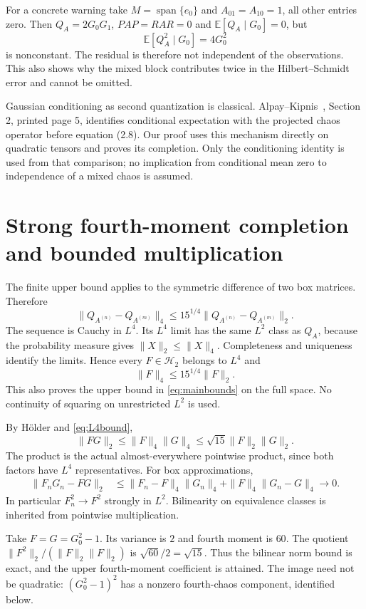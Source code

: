 \documentclass[11pt]{article}
\newcommand{\E}{\mathbb E}
\newcommand{\Hh}{\mathcal H}
\begin{document}
For a concrete warning take $M=\operatorname{span}\{e_0\}$ and
$A_{01}=A_{10}=1$, all other entries zero. Then $Q_A=2G_0G_1$,
$PAP=RAR=0$ and $\E[Q_A\mid G_0]=0$, but
\[
 \E[Q_A^2\mid G_0]=4G_0^2
\]
is nonconstant. The residual is therefore not independent of the
observations. This also shows why the mixed block contributes twice
in the Hilbert--Schmidt error and cannot be omitted.

Gaussian conditioning as second quantization is classical.
Alpay--Kipnis~\cite{AlpayKipnis}, Section 2, printed page 5,
identifies conditional expectation with the projected chaos operator
before equation (2.8). Our proof uses this mechanism directly on
quadratic tensors and proves its completion. Only the conditioning
identity is used from that comparison; no implication from conditional
mean zero to independence of a mixed chaos is assumed.

\section{Strong fourth-moment completion and bounded multiplication}
The finite upper bound applies to the symmetric difference of two
box matrices. Therefore
\[
 \|Q_{A^{(n)}}-Q_{A^{(m)}}\|_4
 \leq15^{1/4}\|Q_{A^{(n)}}-Q_{A^{(m)}}\|_2.
\]
The sequence is Cauchy in $L^4$. Its $L^4$ limit has the same
$L^2$ class as $Q_A$, because the probability measure gives
$\|X\|_2\leq\|X\|_4$. Completeness and uniqueness identify the
limits. Hence every $F\in\Hh_2$ belongs to $L^4$ and
\begin{equation}\label{eq:L4bound}
 \|F\|_4\leq15^{1/4}\|F\|_2.
\end{equation}
This also proves the upper bound in \eqref{eq:mainbounds} on the
full space. No continuity of squaring on unrestricted $L^2$ is used.

By H\"older and \eqref{eq:L4bound},
\[
 \|FG\|_2\leq\|F\|_4\|G\|_4
 \leq\sqrt{15}\|F\|_2\|G\|_2.
\]
The product is the actual almost-everywhere pointwise product, since
both factors have $L^4$ representatives. For box approximations,
\begin{align*}
 \|F_nG_n-FG\|_2
 &\leq\|F_n-F\|_4\|G_n\|_4
       +\|F\|_4\|G_n-G\|_4\longrightarrow0.
\end{align*}
In particular $F_n^2\to F^2$ strongly in $L^2$. Bilinearity on
equivalence classes is inherited from pointwise multiplication.

Take $F=G=G_0^2-1$. Its variance is $2$ and fourth moment is
$60$. The quotient $\|F^2\|_2/(\|F\|_2\|F\|_2)$ is
$\sqrt{60}/2=\sqrt{15}$. Thus the bilinear norm bound is exact,
and the upper fourth-moment coefficient is attained. The image
need not be quadratic: $(G_0^2-1)^2$ has a nonzero fourth-chaos
component, identified below.
\end{document}
